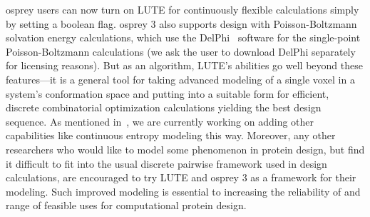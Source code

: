 {\sc osprey} users can now turn on LUTE for continuously flexible calculations simply by setting a boolean flag.  %
{\sc osprey} 3 also supports design with Poisson-Boltzmann solvation energy calculations, which use the DelPhi~\cite{OSOR,DelPhi_surface} software for the single-point Poisson-Boltzmann calculations (we ask the user to download DelPhi separately for licensing reasons).  But as an algorithm, LUTE's abilities go well beyond these features---it is a general tool for taking advanced modeling of a single voxel in a system's conformation space and putting into a suitable form for efficient, discrete combinatorial optimization calculations yielding the best design sequence.  As mentioned in~\cite{LUTE_RECOMB}, we are currently working on adding other capabilities like continuous entropy modeling this way.  Moreover, any other researchers who would like to model some phenomenon in protein design, but find it difficult to fit into the usual discrete pairwise framework used in design calculations, are encouraged to try LUTE and {\sc osprey} 3 as a framework for their modeling.  Such improved modeling is essential to increasing the reliability of and range of feasible uses for computational protein design.  
